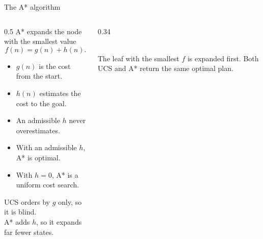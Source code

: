 \documentclass[10pt,aspectratio=169]{beamer}
\begin{document}
\begin{frame}{The A* algorithm}
  \begin{columns}[T,onlytextwidth]
    \hspace*{0.05\textwidth}
    \begin{column}{0.5\textwidth}
      A* expands the node with the smallest value
      \[
        f(n) = g(n) + h(n).
      \]
      \begin{itemize}
        \item $g(n)$ is the cost from the start.
        \item $h(n)$ estimates the cost to the goal.
        \item An admissible $h$ never overestimates.
        \item With an admissible $h$, A* is optimal.
        \item With $h = 0$, A* is a uniform cost search.
      \end{itemize}
      \vspace{0.1cm}
      UCS orders by $g$ only, so it is blind. \\
      A* adds $h$, so it expands far fewer states.
    \end{column}
    \begin{column}{0.34\textwidth}
      \centering
      \vspace{0.5cm}
       \\
      \vspace{0.15cm}
      {\footnotesize The leaf with the smallest $f$ is expanded first.
      Both UCS and A* return the same optimal plan.}
    \end{column}
  \end{columns}
\end{frame}
\end{document}
